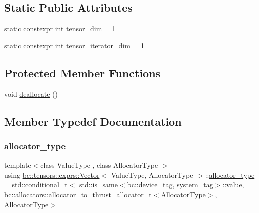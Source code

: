 \subsection*{Static Public Attributes}
\begin{DoxyCompactItemize}
\item 
static constexpr int \hyperlink{structbc_1_1tensors_1_1exprs_1_1Vector_aa7ba3a9be7f59ccc379f5c585ef1e386}{tensor\+\_\+dim} = 1
\item 
static constexpr int \hyperlink{structbc_1_1tensors_1_1exprs_1_1Vector_adc4340375cda2234ab5f9fbfec8af13a}{tensor\+\_\+iterator\+\_\+dim} = 1
\end{DoxyCompactItemize}
\subsection*{Protected Member Functions}
\begin{DoxyCompactItemize}
\item 
void \hyperlink{structbc_1_1tensors_1_1exprs_1_1Vector_a33063c3d12ae3ce08ab16f1d74be3558}{deallocate} ()
\end{DoxyCompactItemize}


\subsection{Member Typedef Documentation}
\mbox{\label{structbc_1_1tensors_1_1exprs_1_1Vector_a94fd93f892cde60396b78ab67b180a19}} 
\subsubsection{\texorpdfstring{allocator\+\_\+type}{allocator\_type}}
{\footnotesize\ttfamily template$<$class Value\+Type , class Allocator\+Type $>$ \\
using \hyperlink{structbc_1_1tensors_1_1exprs_1_1Vector}{bc\+::tensors\+::exprs\+::\+Vector}$<$ Value\+Type, Allocator\+Type $>$\+::\hyperlink{structbc_1_1tensors_1_1exprs_1_1Vector_a94fd93f892cde60396b78ab67b180a19}{allocator\+\_\+type} =  std\+::conditional\+\_\+t$<$ std\+::is\+\_\+same$<$\hyperlink{structbc_1_1device__tag}{bc\+::device\+\_\+tag}, \hyperlink{structbc_1_1tensors_1_1exprs_1_1Vector_a828fecb38556a2bd72fc88dab4eb9bfe}{system\+\_\+tag}$>$\+::value, \hyperlink{namespacebc_1_1allocators_ab6233c0d8d9d7391c3abdbdf1fded326}{bc\+::allocators\+::allocator\+\_\+to\+\_\+thrust\+\_\+allocator\+\_\+t}$<$Allocator\+Type$>$, Allocator\+Type$>$}

